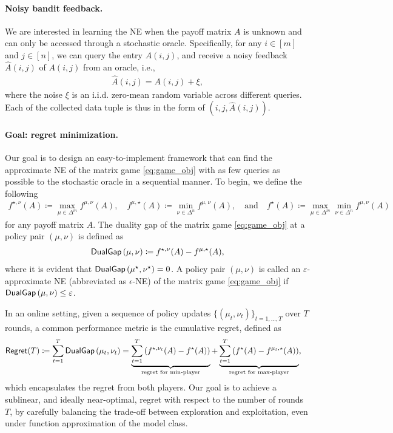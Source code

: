 \paragraph{Noisy bandit feedback.}
We are interested in learning the NE when the payoff matrix $A$ is unknown and can only be accessed through a stochastic oracle. Specifically, for any $i\in[m]$ and $j\in[n]$, 
we can query the entry $A(i,j)$, and receive a noisy feedback $\widehat{A}(i,j)$ of $A(i,j)$ from an oracle, i.e.,
\begin{align}\label{eq:noisy_feedback}
    \widehat{A}(i,j) = A(i,j) + \xi,
\end{align}
where the noise $\xi$ is an i.i.d. zero-mean random variable across different queries. Each of the collected data tuple is thus in the form of $(i,j, \widehat{A}(i,j) )$.
 

\paragraph{Goal: regret minimization.} Our goal is to design an easy-to-implement framework that can find the approximate NE of the matrix game \eqref{eq:game_obj} with as few queries as possible to the stochastic oracle in a sequential manner. To begin, we define the following 
\begin{align}\label{eq:f_notation}
    f^{\star,\nu}(A)\coloneqq \max_{\mu\in\Delta^m} f^{\mu,\nu}(A),\quad f^{\mu,\star}(A)\coloneqq \min_{\nu\in\Delta^n} f^{\mu,\nu}(A),\quad\text{and}\quad f^\star(A)\coloneqq \max_{\mu\in\Delta^m}\min_{\nu\in\Delta^n} f^{\mu,\nu}(A)
\end{align}
for any payoff matrix $A$. The duality gap of the matrix game \eqref{eq:game_obj} at a policy pair $(\mu,\nu)$ is defined as
\begin{align}\label{eq:dualgap}
    \mathsf{DualGap}\left(\mu,\nu\right)\coloneqq    f^{\star,\nu}(A) - f^{\mu,\star}(A) ,
\end{align}
where it is evident that $ \mathsf{DualGap}\left(\mu^{\star},\nu^{\star}\right) = 0$. A policy pair $(\mu,\nu)$ is called an $\varepsilon$-approximate NE (abbreviated as $\epsilon$-NE) of the matrix game \eqref{eq:game_obj} if $\mathsf{DualGap}\left(\mu,\nu\right)\leq \varepsilon$.

In an online setting, given a sequence of policy updates $\{(\mu_t, \nu_t)\}_{t=1,\ldots, T}$ over $T$ rounds, a common performance metric is the cumulative regret, defined as 
\begin{align}\label{eq:regret}
    \mathsf{Regret}(T)&\coloneqq \sum_{t=1}^T\mathsf{DualGap}\left(\mu_t,\nu_t\right)  = \underbrace{ \sum_{t=1}^T \left(  f^{\star,\nu_t}(A)-f^\star(A) \right) }_{\text{regret for min-player}}  + \underbrace{  \sum_{t=1}^T \left( f^\star(A) - f^{\mu_t,\star}(A) \right) }_{\text{regret for max-player}},
\end{align}
which encapsulates the regret from both players. Our goal is to achieve a sublinear, and ideally near-optimal, regret with respect to the number of rounds $T$, by carefully balancing the trade-off between exploration and exploitation, even under function approximation of the model class. 
 

